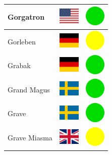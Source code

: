 \documentclass[12pt, a4paper, twoside]{report}
\begin{document}
\begin{center}
\begin{longtable}{|p{5cm}|p{2cm}|p{2cm}|}
 Gorgatron                                                  & \includegraphics[width=1cm]{../4x3/us} &   \includegraphics[width=1cm]{../likes/y} \\ \hline
 Gorleben                                                   & \includegraphics[width=1cm]{../4x3/de} &   \includegraphics[width=1cm]{../likes/m} \\ \hline
 Grabak                                                     & \includegraphics[width=1cm]{../4x3/de} &   \includegraphics[width=1cm]{../likes/y} \\ \hline
 Grand Magus                                                & \includegraphics[width=1cm]{../4x3/se} &   \includegraphics[width=1cm]{../likes/y} \\ \hline
 Grave                                                      & \includegraphics[width=1cm]{../4x3/se} &   \includegraphics[width=1cm]{../likes/y} \\ \hline
 Grave Miasma                                               & \includegraphics[width=1cm]{../4x3/gb} &   \includegraphics[width=1cm]{../likes/m} \\ \hline

\end{longtable}
\end{center}
\end{document}
